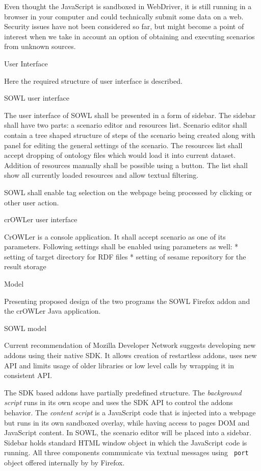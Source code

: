 Even thought the JavaScript is sandboxed in WebDriver, it is still running in a
browser in your computer and could technically submit some data on a web.
Security issues have not been considered so far, but might become a point of
interest when we take in account an option of obtaining and executing scenarios
from unknown sources. 


\sec User Interface

Here the required structure of user interface is described. 

\secc SOWL user interface

The user interface of SOWL shall be presented in a form of sidebar. The sidebar
shall have two parts: a scenario editor and resources list. Scenario editor
shall contain a tree shaped structure of steps of the scenario being created
along with panel for editing the general settings of the scenario. The
resources list shall accept dropping of ontology files which would load it into
current dataset. Addition of resources manually shall be possible using a
button. The list shall show all currently loaded resources and allow textual
filtering. 

SOWL shall enable tag selection on the webpage being processed by clicking or
other user action. 


\secc crOWLer user interface

CrOWLer is a console application. It shall accept scenario as one of its parameters. 
Following settings shall be enabled using parameters as well:
\begitems
  * setting of target directory for RDF files
  * setting of sesame repository for the result storage
\enditems


\sec Model

Presenting proposed design of the two programs the SOWL Firefox addon and the
crOWLer Java application. 

\secc SOWL model

Current recommendation of Mozilla Developer Network suggests developing new
addons using their native SDK. It allows creation of restartless addons, uses 
new API and limits usage of older libraries or low level calls by wrapping it 
in consistent API. 

The SDK based addons have partially predefined structure. The {\em background script}
runs in its own scope and uses the SDK API to control the addons behavior.
The {\em content script} is a JavaScript code that is injected into a webpage
but runs in its own sandboxed overlay, while having access to pages DOM and
JavaScript content. In SOWL, the scenario editor will be placed into a sidebar.
Sidebar holds standard HTML window object in which the JavaScript code is
running.  All three components communicate via textual messages using {\tt
port} object offered internally by by Firefox. 

